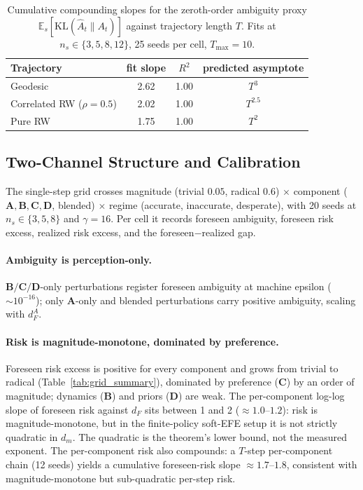 \documentclass[runningheads]{llncs}
\begin{document}
\begin{table}[t]
\centering
\caption{Cumulative compounding slopes for the zeroth-order ambiguity
proxy $\mathbb{E}_s[\mathrm{KL}(\hat A_t\|A_t)]$ against trajectory length
$T$. Fits at $n_s\in\{3,5,8,12\}$, 25 seeds per cell, $T_{\max}=10$.}
\label{tab:recursive_slopes}
\begin{tabular}{lccc}
\toprule
Trajectory & fit slope & $R^2$ & predicted asymptote \\
\midrule
Geodesic & 2.62 & 1.00 & $T^3$ \\
Correlated RW ($\rho{=}0.5$) & 2.02 & 1.00 & $T^{2.5}$ \\
Pure RW & 1.75 & 1.00 & $T^2$ \\
\bottomrule
\end{tabular}
\end{table}
 
\subsection{Two-Channel Structure and Calibration}\label{app:grid}
 
The single-step grid crosses magnitude (trivial $0.05$, radical $0.6$)
$\times$ component ($\mathbf{A}, \mathbf{B}, \mathbf{C}, \mathbf{D}$,
blended) $\times$ regime (accurate, inaccurate, desperate), with 20 seeds
at $n_s \in \{3, 5, 8\}$ and $\gamma = 16$. Per cell it records foreseen
ambiguity, foreseen risk excess, realized risk excess, and the
foreseen$-$realized gap.
 
\paragraph{Ambiguity is perception-only.} $\mathbf{B}/\mathbf{C}/
\mathbf{D}$-only perturbations register foreseen ambiguity at machine
epsilon ($\sim\!10^{-16}$); only $\mathbf{A}$-only and blended
perturbations carry positive ambiguity, scaling with $d_F^A$.
 
\paragraph{Risk is magnitude-monotone, dominated by preference.}
Foreseen risk excess is positive for every component and grows from
trivial to radical (Table~\ref{tab:grid_summary}), dominated by
preference ($\mathbf{C}$) by an order of magnitude; dynamics
($\mathbf{B}$) and priors ($\mathbf{D}$) are weak. The per-component
log-log slope of foreseen risk against $d_F$ sits between 1 and 2
($\approx\!1.0$--$1.2$): risk is magnitude-monotone, but in the
finite-policy soft-EFE setup it is not strictly quadratic in $d_m$. The
quadratic is the theorem's lower bound, not the measured exponent. The
per-component risk also compounds: a $T$-step per-component chain (12
seeds) yields a cumulative foreseen-risk slope $\approx\!1.7$--$1.8$,
consistent with magnitude-monotone but sub-quadratic per-step risk.
 
\end{document}
